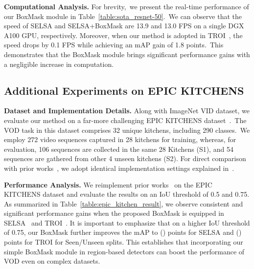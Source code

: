 \documentclass[10pt,twocolumn,letterpaper]{article}
\begin{document}
\vspace{3pt}
\noindent \textbf{Computational Analysis.}
For brevity,~we present the real-time performance of our BoxMask module in Table~\ref{table:sota_resnet-50}.~We can observe that the speed of SELSA and SELSA+BoxMask are 13.9 and 13.0 FPS on a single DGX A100 GPU, respectively. Moreover, when our method is adopted in TROI~\cite{gong2021temporal}, the speed drops by 0.1 FPS while achieving an mAP gain of 1.8 points.~This demonstrates that the BoxMask module brings significant performance gains with a negligible increase in computation.

\subsection{Additional Experiments on EPIC KITCHENS}

\vspace{3pt}
\noindent \textbf{Dataset and Implementation Details.}
Along with ImageNet VID dataset, we evaluate our method on a far-more challenging EPIC KITCHENS dataset~\cite{damen2018scaling}.~The VOD task in this dataset comprises 32 unique kitchens, including 290 classes.~We employ 272 video sequences captured in 28 kitchens for training, whereas, for evaluation, 106 sequences are collected in the same 28 Kitchens (S1), and 54 sequences are gathered from other 4 unseen kitchens (S2). For direct comparison with prior works~\cite{gong2021temporal, wu2019sequence}, we adopt identical implementation settings explained in~\cite{wu2019sequence}.



\vspace{3pt}
\noindent \textbf{Performance Analysis.}
We reimplement prior works~\cite{wu2019sequence, gong2021temporal} on the EPIC KITCHENS dataset and evaluate the results on an IoU threshold of 0.5 and 0.75. As summarized in Table~\ref{table:epic_kitchen_result}, we observe consistent and significant performance gains when the proposed BoxMask is equipped in SELSA~\cite{wu2019sequence} and TROI~\cite{gong2021temporal}. It is important to emphasize that on a higher IoU threshold of 0.75, our BoxMask further improves the mAP to () points for SELSA and () points for TROI for Seen/Unseen splits. This establishes that incorporating our simple BoxMask module in region-based detectors can boost the performance of VOD even on complex datasets.
\end{document}
